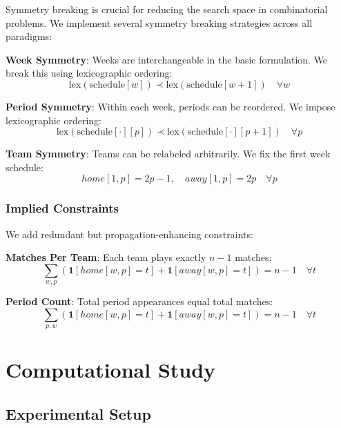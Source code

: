 \documentclass[11pt]{article}
\begin{document}
Symmetry breaking is crucial for reducing the search space in combinatorial problems. We implement several symmetry breaking strategies across all paradigms:

\textbf{Week Symmetry}: Weeks are interchangeable in the basic formulation. We break this using lexicographic ordering:
\begin{equation}
\text{lex}(\text{schedule}[w]) \prec \text{lex}(\text{schedule}[w+1]) \quad \forall w
\end{equation}

\textbf{Period Symmetry}: Within each week, periods can be reordered. We impose lexicographic ordering:
\begin{equation}
\text{lex}(\text{schedule}[\cdot][p]) \prec \text{lex}(\text{schedule}[\cdot][p+1]) \quad \forall p
\end{equation}

\textbf{Team Symmetry}: Teams can be relabeled arbitrarily. We fix the first week schedule:
\begin{equation}
home[1,p] = 2p-1, \quad away[1,p] = 2p \quad \forall p
\end{equation}

\subsubsection{Implied Constraints}

We add redundant but propagation-enhancing constraints:

\textbf{Matches Per Team}: Each team plays exactly $n-1$ matches:
\begin{equation}
\sum_{w,p} (\mathbf{1}[home[w,p] = t] + \mathbf{1}[away[w,p] = t]) = n-1 \quad \forall t
\end{equation}

\textbf{Period Count}: Total period appearances equal total matches:
\begin{equation}
\sum_{p,w} (\mathbf{1}[home[w,p] = t] + \mathbf{1}[away[w,p] = t]) = n-1 \quad \forall t
\end{equation}

\section{Computational Study}

\subsection{Experimental Setup}
\end{document}
